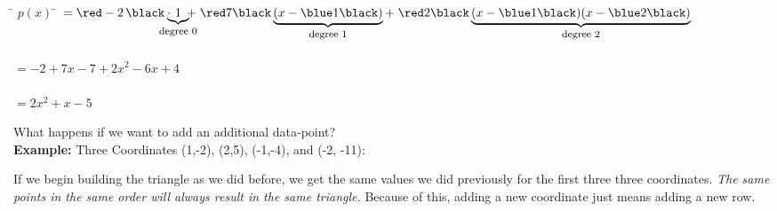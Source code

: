 \documentclass[a4paper,12pt]{report}
\begin{document}
\begin{tabbing}
	\hspace{3.3cm} \= $p(x)$ \hspace{1mm} \=  $= \red -2 \, \black \cdot \!\!\!\!\!\!\!
	\underbrace{1}_{\text{\footnotesize{degree 0}}} \!\!\!\!\!\!
	+ \; \red 7 \black \underbrace{(x-\blue 1 \black)} _{\text{\footnotesize{degree 1}}}
	+ \; \red 2 \black \underbrace{(x-\blue 1 \black)(x-\blue 2 \black)}_{\text{\footnotesize{degree 2}}}$\\ \\

	\>\>$= -2 + 7x - 7 + 2x^2 - 6x + 4$\\ \\

	\>\>$= 2x^2 + x -5$\\
\end{tabbing}

	What happens if we want to add an additional data-point?\\

	\noindent \textbf{Example:} Three Coordinates (1,-2), (2,5), (-1,-4), and (-2, -11):

\begin{center}
\end{center}

	\noindent If we begin building the triangle as we did before, we get the same values we did previously for the first three
	three coordinates. \textit{The same points in the same order will always result in the same triangle.}  Because of this,
	adding a new coordinate just means adding a new row.
\end{document}
